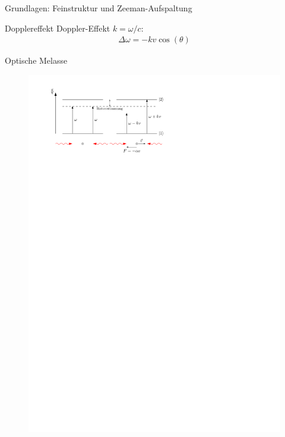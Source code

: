 \documentclass[12pt]{beamer}
\begin{document}
\begin{frame}{Grundlagen: Feinstruktur und Zeeman-Aufspaltung}
\end{frame}

\begin{frame}{Dopplereffekt}
	Doppler-Effekt $k = \omega / c$:
	\begin{align}
		\Delta \omega = - k v \cos(\theta)
	\end{align}
\end{frame}

\begin{frame}{Optische Melasse}
\begin{figure}[h]
	\centering
	\includegraphics[width=\textwidth]{./figures/melasse.pdf}
\end{figure}
\end{frame}
\end{document}
